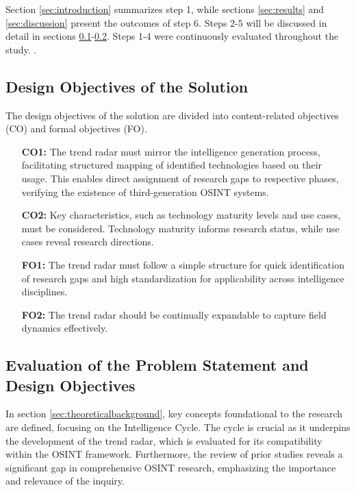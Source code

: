 \documentclass[10pt]{article}
\begin{document}
Section \ref{sec:introduction} summarizes step 1, while sections \ref{sec:results} and \ref{sec:discussion} present the outcomes of step 6. Steps 2-5 will be discussed in detail in sections \ref{sec:designobjectives}-\ref{sec:eval}. Steps 1-4 were continuously evaluated throughout the study. \cite{Sonnenberg.2012}.


\subsection{Design Objectives of the Solution} \label{sec:designobjectives}


The design objectives of the solution are divided into content-related objectives (CO) and formal objectives (FO).

\begin{itemize}
    \item[\textbf{CO1:}] The trend radar must mirror the intelligence generation process, facilitating structured mapping of identified technologies based on their usage. This enables direct assignment of research gaps to respective phases, verifying the existence of third-generation OSINT systems.
    \item[\textbf{CO2:}] Key characteristics, such as technology maturity levels and use cases, must be considered. Technology maturity informs research status, while use cases reveal research directions.
    \item[\textbf{FO1:}] The trend radar must follow a simple structure for quick identification of research gaps and high standardization for applicability across intelligence disciplines.
    \item[\textbf{FO2:}] The trend radar should be continually expandable to capture field dynamics effectively.
\end{itemize}

\subsection{Evaluation of the Problem Statement and Design Objectives} \label{sec:eval}
In section \ref{sec:theoreticalbackground}, key concepts foundational to the research are defined, focusing on the Intelligence Cycle. The cycle is crucial as it underpins the development of the trend radar, which is evaluated for its compatibility within the OSINT framework. Furthermore, the review of prior studies reveals a significant gap in comprehensive OSINT research, emphasizing the importance and relevance of the inquiry.
\end{document}
